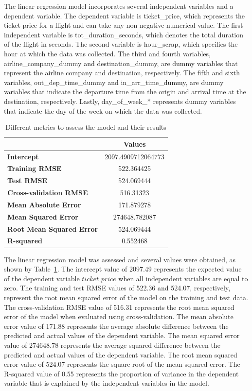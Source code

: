 The linear regression model incorporates several independent variables and a dependent variable.
The dependent variable is ticket\_price, which represents the ticket price for a flight and can take any non-negative numerical value.
The first independent variable is tot\_duration\_seconds, which denotes the total duration of the flight in seconds.
The second variable is hour\_scrap, which specifies the hour at which the data was collected.
The third and fourth variables, airline\_company\_dummy and destination\_dummy, are dummy variables that represent the airline company and destination, respectively.
The fifth and sixth variables, out\_dep\_time\_dummy and in\_arr\_time\_dummy, are dummy variables that indicate the departure time from the origin and arrival time at the destination, respectively.
Lastly, day\_of\_week\_* represents dummy variables that indicate the day of the week on which the data was collected.

\begin{table}[H]
  \centering
  \begin{tabular}{l c}
  \hline
   & \textbf{Values} \\
  \hline
  \textbf{Intercept} & 2097.4909712064773 \\
  \textbf{Training RMSE} & 522.364425 \\
  \textbf{Test RMSE} & 524.069444 \\
  \textbf{Cross-validation RMSE} & 516.31323 \\
  \textbf{Mean Absolute Error} & 171.879278 \\
  \textbf{Mean Squared Error} & 274648.782087 \\
  \textbf{Root Mean Squared Error} & 524.069444 \\
  \textbf{R-squared} & 0.552468 \\
  \hline
  \end{tabular}
  \caption{Different metrics to assess the model and their results}
  \label{tab:my_tab}
\end{table}

The linear regression model was assessed and several values were obtained, as shown by Table~\ref{tab:my_tab}. 
The intercept value of 2097.49 represents the expected value of the dependent variable \(ticket\_price\) when all independent variables are equal to zero.
The training and test RMSE values of 522.36 and 524.07, respectively, represent the root mean squared error of the model on the training and test data.
The cross-validation RMSE value of 516.31 represents the root mean squared error of the model when evaluated using cross-validation.
The mean absolute error value of 171.88 represents the average absolute difference between the predicted and actual values of the dependent variable.
The mean squared error value of 274648.78 represents the average squared difference between the predicted and actual values of the dependent variable.
The root mean squared error value of 524.07 represents the square root of the mean squared error. 
The R-squared value of 0.55 represents the proportion of variance in the dependent variable that is explained by the independent variables in the model.

